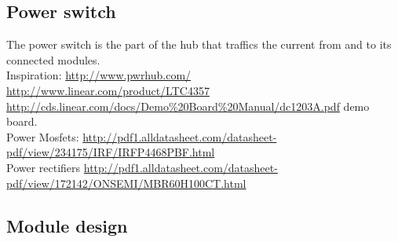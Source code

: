 \subsection{Power switch}
The power switch is the part of the hub that traffics the current from and to its connected modules. 
\\ Inspiration: 
\url{http://www.pwrhub.com/}
\\ \url{http://www.linear.com/product/LTC4357}
\\ \url{http://cds.linear.com/docs/Demo\%20Board\%20Manual/dc1203A.pdf} demo board.
\\ Power Mosfets:
\url{http://pdf1.alldatasheet.com/datasheet-pdf/view/234175/IRF/IRFP4468PBF.html}
\\ Power rectifiers
\url{http://pdf1.alldatasheet.com/datasheet-pdf/view/172142/ONSEMI/MBR60H100CT.html}


\subsection{Module design}


